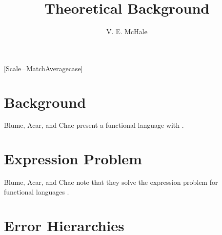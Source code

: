 \documentclass{article}
\begin{document}
\title{Theoretical Background}
\author {V. E. McHale}
\maketitle

\tableofcontents

\setmonofont{DejaVu Sans Mono}[Scale=MatchAveragecase]


\section{Background}

Blume, Acar, and Chae present a functional language with \cite{blume2006}.


\section{Expression Problem}

Blume, Acar, and Chae note that they solve the expression problem for functional languages \cite{blume2006}.






\section{Error Hierarchies}






\appendix
\end{document}
